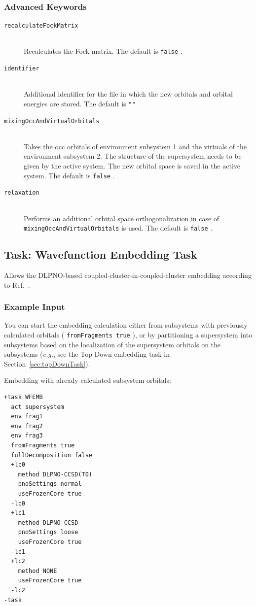 \documentclass[bibliography=totocnumbered,a4paper,10pt,oneside]{scrbook}
\newcommand{\ttt}[1]{%
  \begingroup\setlength{\fboxsep}{1pt}%
  \colorbox{serenity-green!30}{\texttt{\hspace*{2pt}\vphantom{(g}#1\hspace*{2pt}}}%
  \endgroup
}
\begin{document}
\subsubsection{Advanced Keywords}
\begin{description}
  \item[\texttt{recalculateFockMatrix}]\hfill\\
  Recalculates the Fock matrix. The default is \ttt{false}.
  \item[\texttt{identifier}]\hfill\\
  Additional identifier for the file in which the new orbitals and orbital energies are stored. The default is \ttt{""}
  \item[\texttt{mixingOccAndVirtualOrbitals}]\hfill\\
  Takes the occ orbitals of environment subsystem 1 and the virtuals of the environment subsystem 2. The structure of the supersystem needs to be given by the active system. The new orbital space is saved in the active system. The default is \ttt{false}.
  \item[\texttt{relaxation}]\hfill\\
  Performs an additional orbital space orthogonalization in case of \texttt{mixingOccAndVirtualOrbitals} is used. The default is \ttt{false}. 
\end{description}

\subsection{Task: Wavefunction Embedding Task}
\label{sec:WFinWFTask}
Allows the DLPNO-based coupled-cluster-in-coupled-cluster embedding according to Ref.~\cite{Sparta2017}.
\subsubsection{Example Input}
You can start the embedding calculation either from subsystems with previously calculated orbitals
(\ttt{fromFragments true}), or by partitioning a supersystem into subsystems based on the localization
of the supersystem orbitals on the subsystems (\emph{e.g.}, see the Top-Down embedding task in
Section~\ref{sec:topDownTask}).

Embedding with already calculated subsystem orbitals:
\begin{lstlisting}
+task WFEMB
  act supersystem
  env frag1
  env frag2
  env frag3
  fromFragments true
  fullDecomposition false
  +lc0
    method DLPNO-CCSD(T0)
    pnoSettings normal
    useFrozenCore true
  -lc0
  +lc1
    method DLPNO-CCSD
    pnoSettings loose
    useFrozenCore true
  -lc1
  +lc2
    method NONE
    useFrozenCore true
  -lc2
-task
\end{lstlisting}
\end{document}
